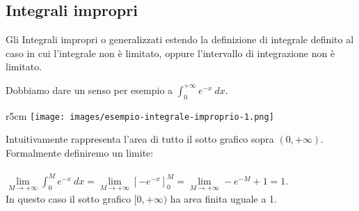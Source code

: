 \subsection{Integrali impropri}
Gli Integrali impropri o generalizzati estendo la definizione di integrale definito al caso in cui l'integrale non è limitato, oppure l'intervallo di integrazione non è limitato.
\begin{example}
Dobbiamo dare un senso per esempio a $\int_0^{+\infty}e^{-x}\:dx$.
\end{example}
\begin{wrapfigure}[6]{r}{5cm}
    \vspace{-25pt}
    \centering
    \texttt{[image: images/esempio-integrale-improprio-1.png]}
\end{wrapfigure}
Intuitivamente rappresenta l'area di tutto il sotto grafico sopra $(0,+\infty)$.
Formalmente definiremo un limite: \\\\
$\lim\limits_{M\to +\infty}\int_0^Me^{-x}\:dx = \lim\limits_{M\to + \infty}[-e^{-x}]^M_0=\lim\limits_{M\to +\infty}-e^{-M}+1 = 1$.\\
In questo caso il sotto grafico $[0,+\infty)$ ha area finita uguale a 1.

